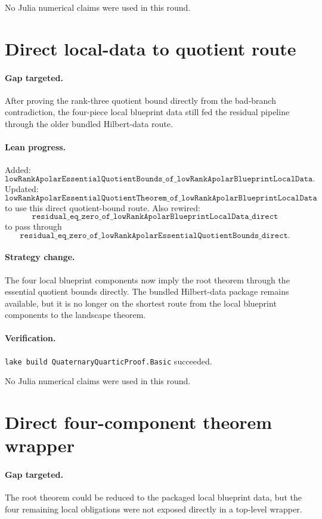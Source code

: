 \documentclass[11pt]{article}
\begin{document}
No Julia numerical claims were used in this round.

\section*{Direct local-data to quotient route}

\paragraph{Gap targeted.}
After proving the rank-three quotient bound directly from the bad-branch
contradiction, the four-piece local blueprint data still fed the residual
pipeline through the older bundled Hilbert-data route.

\paragraph{Lean progress.}
Added:
\[
\texttt{lowRankApolarEssentialQuotientBounds\_of\_lowRankApolarBlueprintLocalData}.
\]
Updated:
\[
\texttt{lowRankApolarEssentialQuotientTheorem\_of\_lowRankApolarBlueprintLocalData}
\]
to use this direct quotient-bound route.  Also rewired:
\[
\texttt{residual\_eq\_zero\_of\_lowRankApolarBlueprintLocalData\_direct}
\]
to pass through
\[
\texttt{residual\_eq\_zero\_of\_lowRankApolarEssentialQuotientBounds\_direct}.
\]

\paragraph{Strategy change.}
The four local blueprint components now imply the root theorem through the
essential quotient bounds directly.  The bundled Hilbert-data package remains
available, but it is no longer on the shortest route from the local blueprint
components to the landscape theorem.

\paragraph{Verification.}
\texttt{lake build QuaternaryQuarticProof.Basic} succeeded.

No Julia numerical claims were used in this round.

\section*{Direct four-component theorem wrapper}

\paragraph{Gap targeted.}
The root theorem could be reduced to the packaged local blueprint data, but
the four remaining local obligations were not exposed directly in a top-level
wrapper.
\end{document}
